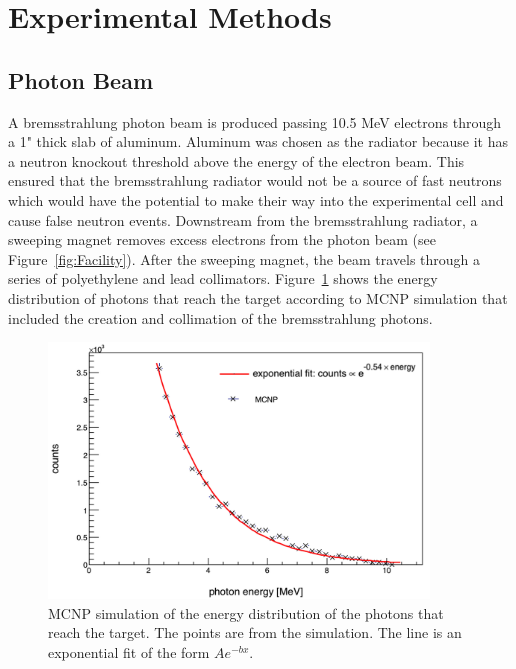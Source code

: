 \section{Experimental Methods}
\subsection{Photon Beam}
A bremsstrahlung photon beam is produced passing 10.5 MeV electrons through a 1" thick slab of aluminum.
Aluminum was chosen as the radiator because it has a neutron knockout threshold above the energy of the electron beam.
This ensured that the bremsstrahlung radiator would not be a source of fast neutrons which would have the potential to make their way into the experimental cell and cause false neutron events.
Downstream from the bremsstrahlung radiator, a sweeping magnet removes excess electrons from the photon beam (see Figure~\ref{fig:Facility}).
After the sweeping magnet, the beam travels through a series of polyethylene and lead collimators.
Figure~\ref{fig:BremDist} shows the energy distribution of photons that reach the target according to MCNP simulation that included the creation and collimation of the bremsstrahlung photons.

\begin{figure}[h]
\includegraphics[width=0.9\textwidth]{Content/Methods/MCNPBremDistribution.png}
\caption{MCNP simulation of the energy distribution of the photons that reach the target.
The points are from the simulation.
The line is an exponential fit of the form $Ae^{-bx}$.}
\label{fig:BremDist}
\end{figure}


